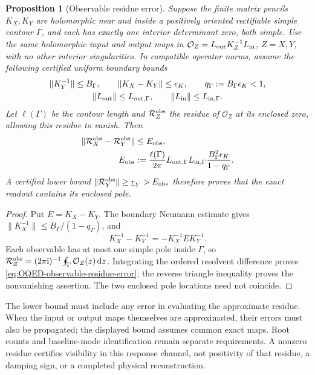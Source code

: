 \documentclass[final,5p,times,twocolumn,numbers,nopreprintline]{elsarticle}
\numberwithin{equation}{section}
\newtheorem{proposition}[theorem]{Proposition}
\theoremstyle{definition}
\theoremstyle{remark}
\newcommand{\dd}{\mathop{}\!\mathrm d}
\newcommand{\ii}{\mathrm i}
\begin{document}
\begin{proposition}[Observable residue error]
\label{prop:OQED-observable-residue-error}
Suppose the finite matrix pencils \(K_X,K_Y\) are holomorphic near
and inside a positively oriented rectifiable simple contour \(\Gamma\),
and each has exactly one interior determinant zero, both simple.
Use the same holomorphic input and output maps in
\(\mathcal O_Z=L_{\rm out}K_Z^{-1}L_{\rm in}\), \(Z=X,Y\),
with no other interior singularities. In compatible operator norms,
assume the following certified uniform boundary bounds
\[
 \begin{gathered}
  \|K_Y^{-1}\|\leq B_\Gamma,\qquad
  \|K_X-K_Y\|\leq\epsilon_K,\qquad
  q_\Gamma:=B_\Gamma\epsilon_K<1,\\
  \|L_{\rm out}\|\leq L_{{\rm out},\Gamma},\qquad
  \|L_{\rm in}\|\leq L_{{\rm in},\Gamma}.
 \end{gathered}
\]
Let \(\ell(\Gamma)\) be the contour length and
\(\mathcal R_Z^{\rm obs}\) the residue of \(\mathcal O_Z\) at
its enclosed zero, allowing this residue to vanish. Then
\begin{equation}
 \begin{aligned}
  \|\mathcal R_X^{\rm obs}-\mathcal R_Y^{\rm obs}\|
      &\leq E_{\rm obs},\\
  E_{\rm obs}&:=\frac{\ell(\Gamma)}{2\pi}
       L_{{\rm out},\Gamma}L_{{\rm in},\Gamma}
       \frac{B_\Gamma^2\epsilon_K}{1-q_\Gamma}.
 \end{aligned}
 \label{eq:OQED-observable-residue-error}
\end{equation}
A certified lower bound
\(\|\mathcal R_Y^{\rm obs}\|\geq\underline r_Y>E_{\rm obs}\)
therefore proves that the exact readout contains its enclosed pole.
\end{proposition}
\begin{proof}
Put \(E=K_X-K_Y\). The boundary Neumann estimate gives
\(\|K_X^{-1}\|\leq B_\Gamma/(1-q_\Gamma)\), and
\[
 K_X^{-1}-K_Y^{-1}=-K_X^{-1}E K_Y^{-1}.
\]
Each observable has at most one simple pole inside \(\Gamma\), so
\(\mathcal R_Z^{\rm obs}=(2\pi\ii)^{-1}
\oint_\Gamma\mathcal O_Z(z)\dd z\). Integrating the ordered
resolvent difference proves \eqref{eq:OQED-observable-residue-error};
the reverse triangle inequality proves the nonvanishing assertion.
The two enclosed pole locations need not coincide.
\end{proof}

The lower bound must include any error in evaluating the approximate
residue. When the input or output maps themselves are approximated,
their errors must also be propagated; the displayed bound assumes common
exact maps. Root counts and baseline-mode identification remain separate
requirements. A nonzero residue certifies visibility in this response
channel, not positivity of that residue, a damping sign, or a completed
physical reconstruction.
\end{document}
